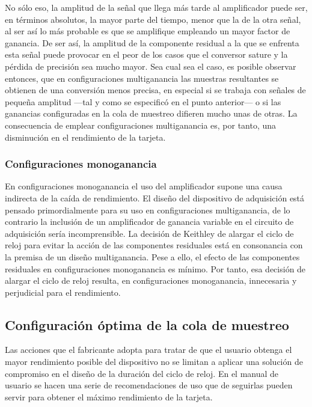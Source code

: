 No sólo eso, la amplitud de la señal que llega más tarde al amplificador
puede ser, en términos absolutos, la mayor parte del tiempo, menor que la
de la otra señal, al ser así lo más probable es que se amplifique empleando
un mayor factor de ganancia. De ser así, la amplitud de la componente
residual a la que se enfrenta esta señal puede provocar en el peor de los
casos que el conversor sature y la pérdida de precisión sea mucho mayor.
Sea cual sea el caso, es posible observar entonces, que en configuraciones
multiganancia las muestras resultantes se obtienen de una conversión menos
precisa, en especial si se trabaja con señales de pequeña amplitud ---tal y
como se especificó en el punto anterior--- o si las ganancias configuradas
en la cola de muestreo difieren mucho unas de otras. La consecuencia de
emplear configuraciones multiganancia es, por tanto, una disminución en el
rendimiento de la tarjeta.


\subsubsection{Configuraciones monoganancia}

En configuraciones monoganancia el uso del amplificador supone una causa
indirecta de la caída de rendimiento. El diseño del dispositivo de
adquisición está pensado primordialmente para su uso en configuraciones
multiganancia, de lo contrario la inclusión de un amplificador de ganancia
variable en el circuito de adquisición sería incomprensible. La decisión de
Keithley de alargar el ciclo de reloj para evitar la acción de las
componentes residuales está en consonancia con la premisa de un diseño
multiganancia. Pese a ello, el efecto de las componentes residuales en
configuraciones monoganancia es mínimo. Por tanto, esa decisión de alargar
el ciclo de reloj resulta, en configuraciones monoganancia, innecesaria y
perjudicial para el rendimiento.


\subsection{Configuración óptima de la cola de muestreo}

Las acciones que el fabricante adopta para tratar de que el usuario obtenga
el mayor rendimiento posible del dispositivo no se limitan a aplicar una
solución de compromiso en el diseño de la duración del ciclo de reloj. En
el manual de usuario se hacen una serie de recomendaciones de uso que de
seguirlas pueden servir para obtener el máximo rendimiento de la tarjeta.

